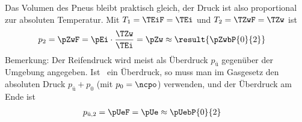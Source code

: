 Das Volumen des Pneus bleibt praktisch gleich, der Druck ist also proportional zur absoluten Temperatur. Mit $T_1 = \TEiF = \TEi$ und $T_2 = \TZwF = \TZw$ ist
\begin{align}
 p_2 &= \pZwF = \pEi\cdot\frac{\TZw}{\TEi} = \pZw \approx \result{\pZwbP{0}{2}}
\end{align}
Bemerkung: Der Reifendruck wird meist als Überdruck $p_\text{ü}$ gegenüber der Umgebung angegeben. Ist \pEiO\ ein Überdruck, so muss man im Gasgesetz den absoluten Druck $p_\text{ü}+p_0$ (mit $p_0 = \ncpo$) verwenden, und der Überdruck am Ende ist
\begin{align}
 p_\text{ü,2} &= \pUeF = \pUe \approx \pUebP{0}{2}
\end{align}
